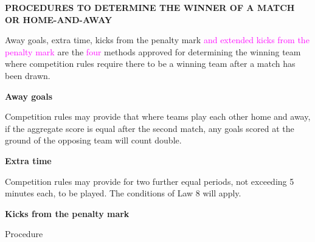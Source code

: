\clearpage
\sffamily
{\bfseries\color[rgb]{0.4,0.4,0.4}
PROCEDURES TO DETERMINE THE WINNER OF A MATCH OR HOME-AND-AWAY }

\bigskip

Away goals, extra time, kicks from the penalty mark \textcolor{magenta}{and extended kicks from the penalty mark} are the \textcolor{magenta}{four} methods approved for determining the winning team where competition rules require there to be a winning team after a match has been drawn.

\bigskip

{\bfseries Away goals}

Competition rules may provide that where teams play each other home and away, if the aggregate score is equal after the second match, any goals scored at the ground of the opposing team will count double.

\bigskip

{\bfseries Extra time}

Competition rules may provide for two further equal periods, not exceeding 5 minutes each, to be played. The conditions of Law 8 will apply. 
{\color[rgb]{0.4,0.4,0.4}{(replaces: Competition rules may
provide for two further equal periods, not exceeding 15 minutes each, to be played. The conditions of Law 8 will apply. )}}

\bigskip

{\bfseries Kicks from the penalty mark }

Procedure

\headlinebox
 
